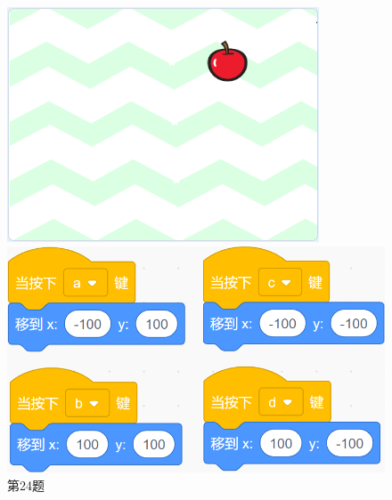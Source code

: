 \documentclass[10pt, a4paper]{article}
\begin{document}
\begin{enumerate}
        \begin{figure}[htbp]
            \centering
            \begin{minipage}[t]{.45\textwidth}
                \centering
                \begin{minipage}[t]{.42\textwidth}
                    \centering
                    \includegraphics[width=\textwidth]{24-1.png}
                \end{minipage}
                \begin{minipage}[t]{.55\textwidth}
                    \centering
                    \includegraphics[width=\textwidth]{24-2.png}
                \end{minipage}
                \caption*{第24题}
            \end{minipage}
            \begin{minipage}[t]{.25\textwidth}

\end{minipage}
\end{figure}
\end{enumerate}
\end{document}
